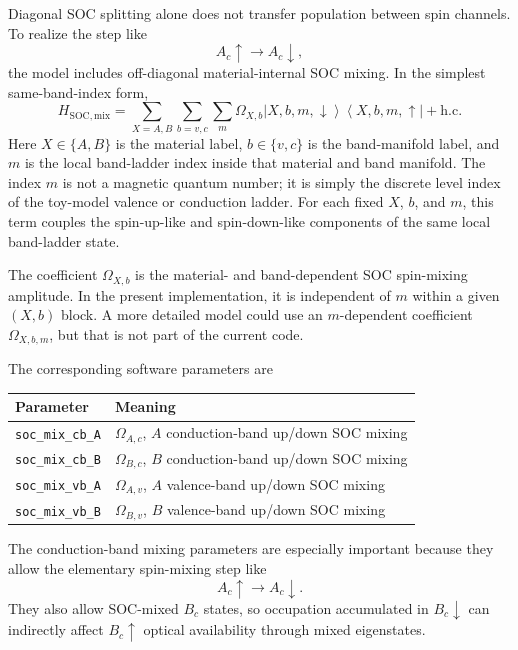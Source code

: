 \documentclass[11pt,a4paper]{article}
\newcommand{\ket}[1]{\left|#1\right\rangle}
\newcommand{\bra}[1]{\left\langle #1\right|}
\begin{document}
Diagonal SOC splitting alone does not transfer population between spin channels.  To realize the step like
\begin{equation}
A_c\uparrow \rightarrow A_c\downarrow,
\end{equation}
the model includes off-diagonal material-internal SOC mixing.  In the simplest same-band-index form,
\begin{equation}
H_{\mathrm{SOC,mix}} =
\sum_{X=A,B}\sum_{b=v,c}\sum_m
\Omega_{X,b}
\ket{X,b,m,\downarrow}\bra{X,b,m,\uparrow}
+\mathrm{h.c.}
\end{equation}
Here \(X\in\{A,B\}\) is the material label, \(b\in\{v,c\}\) is the band-manifold label, and \(m\) is the local band-ladder index inside that material and band manifold.  The index \(m\) is not a magnetic quantum number; it is simply the discrete level index of the toy-model valence or conduction ladder.  For each fixed \(X\), \(b\), and \(m\), this term couples the spin-up-like and spin-down-like components of the same local band-ladder state.

The coefficient \(\Omega_{X,b}\) is the material- and band-dependent SOC spin-mixing amplitude.  In the present implementation, it is independent of \(m\) within a given \((X,b)\) block.  A more detailed model could use an \(m\)-dependent coefficient \(\Omega_{X,b,m}\), but that is not part of the current code.

The corresponding software parameters are
\begin{center}
\begin{tabular}{ll}
\toprule
Parameter & Meaning \\
\midrule
\texttt{soc\_mix\_cb\_A} & \(\Omega_{A,c}\), $A$ conduction-band up/down SOC mixing \\
\texttt{soc\_mix\_cb\_B} & \(\Omega_{B,c}\), $B$ conduction-band up/down SOC mixing \\
\texttt{soc\_mix\_vb\_A} & \(\Omega_{A,v}\), $A$ valence-band up/down SOC mixing \\
\texttt{soc\_mix\_vb\_B} & \(\Omega_{B,v}\), $B$ valence-band up/down SOC mixing \\
\bottomrule
\end{tabular}
\end{center}
The conduction-band mixing parameters are especially important because they allow the elementary spin-mixing step like
\begin{equation}
A_c\uparrow \rightarrow A_c\downarrow.
\end{equation}
They also allow SOC-mixed $B_c$ states, so occupation accumulated in $B_c\downarrow$ can indirectly affect $B_c\uparrow$ optical availability through mixed eigenstates.
\end{document}
